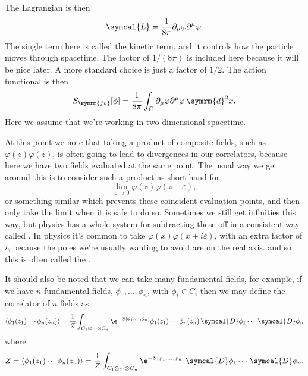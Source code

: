 \documentclass[fleqn]{NotesClass}
\renewcommand{\dd}[1]{\,\symrm{d}#1}
\newcommand{\DD}{\,\symcal{D}}
\DeclarePairedDelimiter{\correlator}{\langle}{\rangle}
\newcommand{\lagrangian}{\symcal{L}}
\newcommand{\freeboson}{\symrm{fb}}
\begin{document}
    The Lagrangian is then
    \begin{equation}
        \lagrangian = \frac{1}{8\pi}\partial_\mu \varphi \partial^\mu \varphi.
    \end{equation}
    The single term here is called the kinetic term, and it controls how the particle moves through spacetime.
    The factor of \(1/(8\pi)\) is included here because it will be nice later.
    A more standard choice is just a factor of \(1/2\).
    The action functional is then
    \begin{equation}
        S_{\freeboson}[\phi] = \frac{1}{8\pi} \int_C \partial_\mu \varphi \partial^\mu \varphi \dd{^2x}.
    \end{equation}
    Here we assume that we're working in two dimensional spacetime.
    
    At this point we note that taking a product of composite fields, such as \(\varphi(z)\varphi(z)\), is often going to lead to divergences in our correlators, because here we have two fields evaluated at the same point.
    The usual way we get around this is to consider such a product as short-hand for
    \begin{equation}
        \lim_{\varepsilon \to 0} \varphi(z)\varphi(z + \varepsilon),
    \end{equation}
    or something similar which prevents these coincident evaluation points, and then only take the limit when it is safe to do so.
    Sometimes we still get infinities this way, but physics has a whole system for subtracting these off in a consistent way called .
    In physics it's common to take \(\varphi(x)\varphi(x + i\varepsilon)\), with an extra factor of \(i\), because the poles we're usually wanting to avoid are on the real axis. and so this is often called the .
    
    It should also be noted that we can take many fundamental fields, for example, if we have \(n\) fundamental fields, \(\phi_1, \dotsc, \phi_n\), with \(\phi_i \in C_i\) then we may define the correlator of \(n\) fields as
    \begin{equation*}
        \correlator{\phi_1(z_1) \dotsm \phi_n(z_n)} = \frac{1}{Z}\int_{C_1 \otimes \dotsb \otimes C_n} \e^{-S[\phi_1, \dotsc, \phi_n]} \phi_1(z_1) \dotsm \phi_n(z_n) \DD\phi_1 \dotsm \DD\phi_n
    \end{equation*}
    where
    \begin{equation}
        Z = \correlator{\phi_1(z_1) \dotsm \phi_n(z_n)} = \frac{1}{Z}\int_{C_1 \otimes \dotsb \otimes C_n} \e^{-S[\phi_1, \dotsc, \phi_n]} \DD\phi_1 \dotsm \DD\phi_n.
    \end{equation}
    
\end{document}

